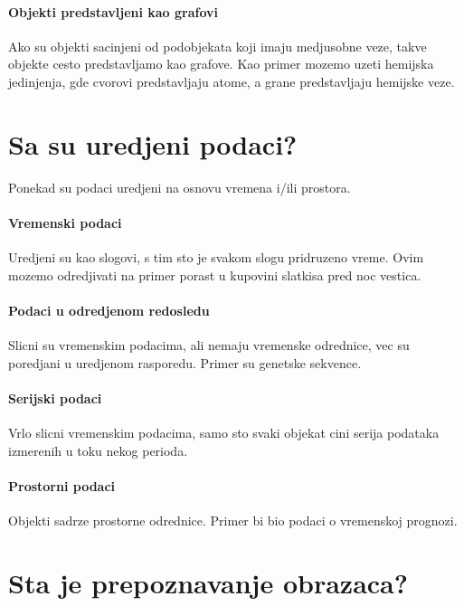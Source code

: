 \documentclass[a4paper]{article}
\begin{document}
\paragraph{Objekti predstavljeni kao grafovi}

Ako su objekti sacinjeni od podobjekata koji imaju medjusobne veze, takve objekte cesto
predstavljamo kao grafove. Kao primer mozemo uzeti hemijska jedinjenja, gde cvorovi predstavljaju
atome, a grane predstavljaju hemijske veze.

\section{Sa su uredjeni podaci?}

Ponekad su podaci uredjeni na osnovu vremena i/ili prostora.

\paragraph{Vremenski podaci}

Uredjeni su kao slogovi, s tim sto je svakom slogu pridruzeno vreme. Ovim mozemo odredjivati na
primer porast u kupovini slatkisa pred noc vestica.

\paragraph{Podaci u odredjenom redosledu}

Slicni su vremenskim podacima, ali nemaju vremenske odrednice, vec su poredjani u uredjenom
rasporedu. Primer su genetske sekvence.

\paragraph{Serijski podaci}

Vrlo slicni vremenskim podacima, samo sto svaki objekat cini serija podataka izmerenih u toku nekog
perioda.

\paragraph{Prostorni podaci}

Objekti sadrze prostorne odrednice. Primer bi bio podaci o vremenskoj prognozi.

\section{Sta je prepoznavanje obrazaca?}
\end{document}
